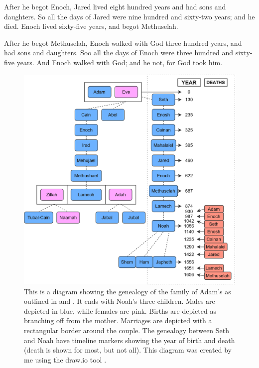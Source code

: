 \bverse After he begot Enoch, Jared lived eight hundred years and had sons and daughters.
\bverse So all the days of Jared were nine hundred and sixty-two years; and he died.
\bverse Enoch lived sixty-five years, and begot Methuselah.
	
\bverse After he begot Methuselah, Enoch walked with God three hundred years, and had sons and daughters.
\bverse Soo all the days of Enoch were three hundred and sixty-five years.
\bverse And Enoch walked with God; and he \was not, for God took him.

\bverse 
\bverse 
\bverse 
\bverse 
\bverse 
\bverse 
\bverse 
\bverse 




\begin{figure}[htbp] %
  \centering
  \includegraphics[width=\linewidth]{images/genealogies/noahs_genealogy.png}
  \caption{This is a diagram showing the genealogy of the family of Adam's as outlined in  and . It ends with Noah's three children. Males are depicted in blue, while females are pink. Births are depicted as branching off from the mother. Marriages are depicted with a rectangular border around the couple. The genealogy between Seth and Noah have timeline markers showing the year of birth and death (death is shown for most, but not all). This diagram was created by me using the draw.io tool \cite{draw.io}.}
  \label{fig:noahs_genealogy}
\end{figure}